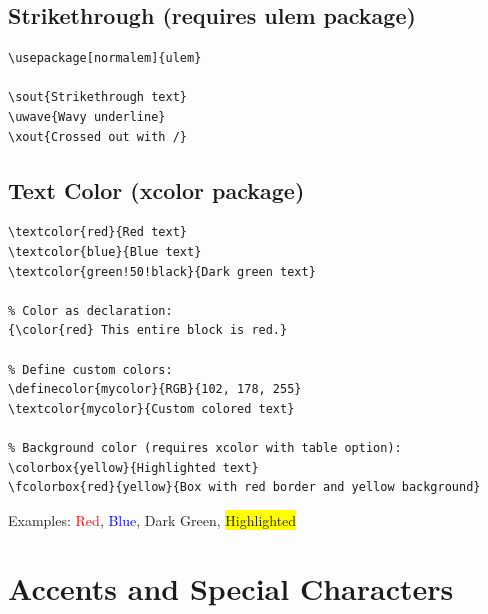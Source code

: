 \subsection{Strikethrough (requires ulem package)}

\begin{lstlisting}[language={[LaTeX]TeX}, caption=Strikethrough]
\usepackage[normalem]{ulem}

\sout{Strikethrough text}
\uwave{Wavy underline}
\xout{Crossed out with /}
\end{lstlisting}

\subsection{Text Color (xcolor package)}

\begin{lstlisting}[language={[LaTeX]TeX}, caption=Using colors]
\textcolor{red}{Red text}
\textcolor{blue}{Blue text}
\textcolor{green!50!black}{Dark green text}

% Color as declaration:
{\color{red} This entire block is red.}

% Define custom colors:
\definecolor{mycolor}{RGB}{102, 178, 255}
\textcolor{mycolor}{Custom colored text}

% Background color (requires xcolor with table option):
\colorbox{yellow}{Highlighted text}
\fcolorbox{red}{yellow}{Box with red border and yellow background}
\end{lstlisting}

Examples: \textcolor{red}{Red}, \textcolor{blue}{Blue}, \textcolor{green!50!black}{Dark Green}, \colorbox{yellow}{Highlighted}

\section{Accents and Special Characters}

